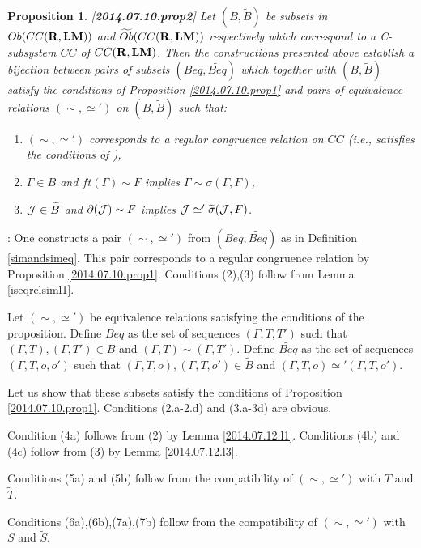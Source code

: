 \documentclass[11pt]{article}
\newenvironment{proof}{{\bf Proof}:}{\vskip 5mm }
\newtheorem{proposition}{Proposition}[subsection]
\newcommand{\llabel}[1]{\label{#1}[{\bf #1}]}
\newcommand{\rr}{{\bf R}}
\newcommand{\lm}{{\bf LM}}
\newcommand{\wt}{\widetilde}
\begin{document}
\begin{proposition}
\llabel{2014.07.10.prop2}
Let $(B,\wt{B})$ be subsets in $Ob(CC(\rr,\lm))$ and $\wt{Ob}(CC(\rr,\lm))$ respectively which correspond to a C-subsystem $CC$ of $CC(\rr,\lm)$. Then the constructions presented above establish a bijection between pairs of subsets $(Beq,\wt{Beq})$ which together with $(B,\wt{B})$ satisfy the conditions of Proposition \ref{2014.07.10.prop1} and pairs of equivalence relations $(\sim,\simeq')$ on $(B,\wt{B})$ such that:
%
\begin{enumerate}
\item $(\sim,\simeq')$ corresponds to a regular congruence relation on $CC$ (i.e., satisfies the conditions of \cite[Proposition 5.4]{Csubsystems}),
%
\item $\Gamma\in B$ and $ft(\Gamma)\sim F$ implies $\Gamma\sim \sigma(\Gamma,F)$,
%
\item ${\cal J}\in \wt{B}$ and $\partial({\cal J})\sim F$ implies ${\cal J}\simeq' \wt{\sigma}({\cal J},F)$.
\end{enumerate}
\end{proposition}
%
\begin{proof}
One constructs a pair $(\sim,\simeq')$ from $(Beq,\wt{Beq})$ as in Definition \ref{simandsimeq}. 
This pair corresponds to a regular congruence relation by Proposition \ref{2014.07.10.prop1}.
Conditions (2),(3) follow from Lemma \ref{iseqrelsiml1}.

Let $(\sim,\simeq')$ be equivalence relations satisfying the conditions of the proposition. Define $Beq$ as the set of sequences $(\Gamma,T,T')$ such that $(\Gamma,T), (\Gamma,T')\in B$ and $(\Gamma,T)\sim (\Gamma,T')$. Define $\wt{Beq}$ as the set of sequences $(\Gamma,T,o,o')$ such that $(\Gamma,T,o),(\Gamma,T,o')\in \wt{B}$ and $(\Gamma,T,o)\simeq' (\Gamma,T,o')$. 

Let us show that these subsets satisfy the conditions of Proposition \ref{2014.07.10.prop1}. Conditions (2.a-2.d) and (3.a-3d) are obvious. 

Condition (4a) follows from (2) by Lemma \ref{2014.07.12.l1}.
Conditions (4b) and (4c) follow from (3) by Lemma \ref{2014.07.12.l3}.

Conditions (5a) and (5b) follow from the compatibility of $(\sim,\simeq')$ with $T$ and $\wt{T}$. 

Conditions (6a),(6b),(7a),(7b) follow from the compatibility of $(\sim,\simeq')$ with $S$ and $\wt{S}$.
\end{proof}




















\end{document}
